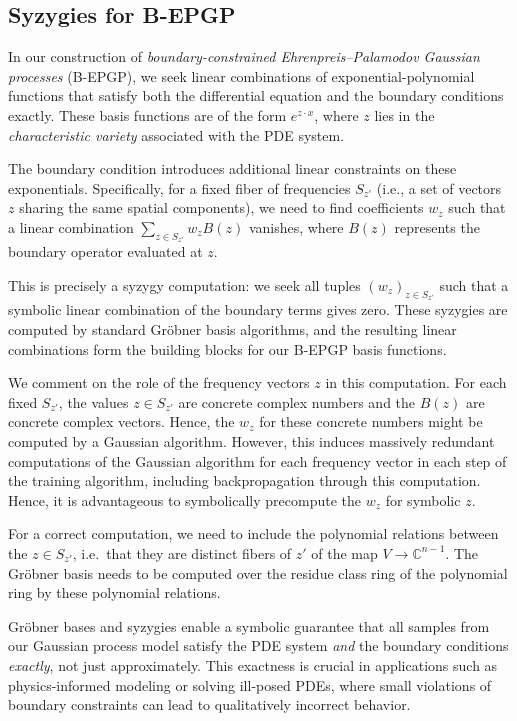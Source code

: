 \documentclass{article} %
\theoremstyle{plain}
\theoremstyle{definition}
\theoremstyle{remark}
\newcommand{\CC}{\mathbb{C}}
\begin{document}
\subsection{Syzygies for B-EPGP}

In our construction of \emph{boundary-constrained Ehrenpreis--Palamodov Gaussian processes} (B-EPGP), we seek linear combinations of exponential-polynomial functions that satisfy both the differential equation and the boundary conditions exactly. These basis functions are of the form $e^{z \cdot x}$, where $z$ lies in the \emph{characteristic variety} associated with the PDE system.

The boundary condition introduces additional linear constraints on these exponentials. Specifically, for a fixed fiber of frequencies $S_{z'}$ (i.e., a set of vectors $z$ sharing the same spatial components), we need to find coefficients $w_z$ such that a linear combination $\sum_{z \in S_{z'}} w_z B(z)$ vanishes, where $B(z)$ represents the boundary operator evaluated at $z$.

This is precisely a syzygy computation: we seek all tuples $(w_z)_{z \in S_{z'}}$ such that a symbolic linear combination of the boundary terms gives zero. These syzygies are computed by standard Gröbner basis algorithms, and the resulting linear combinations form the building blocks for our B-EPGP basis functions.

We comment on the role of the frequency vectors $z$ in this computation. For each fixed $S_{z'}$, the values $z\in S_{z'}$ are concrete complex numbers and the $B(z)$ are concrete complex vectors. Hence, the $w_z$ for these concrete numbers might be computed by a Gaussian algorithm. However, this induces massively redundant computations of the Gaussian algorithm for each frequency vector in each step of the training algorithm, including backpropagation through this computation. Hence, it is advantageous to symbolically precompute the $w_z$ for symbolic $z$.

For a correct computation, we need to include the polynomial relations between the $z\in S_{z'}$, i.e.\ that they are distinct fibers of $z'$ of the map $V\to \CC^{n-1}$. The Gröbner basis needs to be computed over the residue class ring of the polynomial ring by these polynomial relations.

Gröbner bases and syzygies enable a symbolic guarantee that all samples from our Gaussian process model satisfy the PDE system \emph{and} the boundary conditions \emph{exactly}, not just approximately. This exactness is crucial in applications such as physics-informed modeling or solving ill-posed PDEs, where small violations of boundary constraints can lead to qualitatively incorrect behavior.
\end{document}

